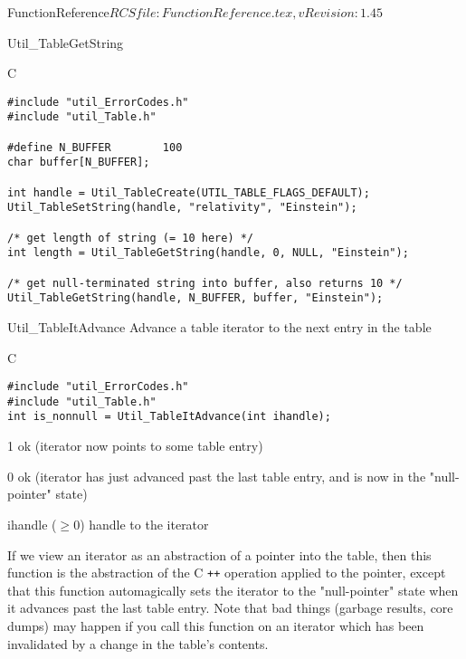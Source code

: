 \begin{cactuspart}{5}{FunctionReference}{$RCSfile: FunctionReference.tex,v $}{$Revision: 1.45 $}
\begin{FunctionDescription}{Util\_TableGetString}
\begin{Example}{C}
\begin{verbatim}
#include "util_ErrorCodes.h"
#include "util_Table.h"

#define N_BUFFER        100
char buffer[N_BUFFER];

int handle = Util_TableCreate(UTIL_TABLE_FLAGS_DEFAULT);
Util_TableSetString(handle, "relativity", "Einstein");

/* get length of string (= 10 here) */
int length = Util_TableGetString(handle, 0, NULL, "Einstein");

/* get null-terminated string into buffer, also returns 10 */
Util_TableGetString(handle, N_BUFFER, buffer, "Einstein");
\end{verbatim}
\end{Example}
\end{FunctionDescription}


\begin{FunctionDescription}{Util\_TableItAdvance}
\label{Util-TableItAdvance}
Advance a table iterator to the next entry in the table

\begin{Synopsis}{C}
\begin{verbatim}
#include "util_ErrorCodes.h"
#include "util_Table.h"
int is_nonnull = Util_TableItAdvance(int ihandle);
\end{verbatim}
\end{Synopsis}

\begin{Result}{\rm 1}
ok (iterator now points to some table entry)
\end{Result}
\begin{Result}{\rm 0}
ok (iterator has just advanced past the last table entry,
    and is now in the "null-pointer" state)
\end{Result}

\begin{Parameter}{ihandle ($\ge 0$)}
handle to the iterator
\end{Parameter}

\begin{Discussion}
If we view an iterator as an abstraction of a pointer into the table,
then this function is the abstraction of the C \verb|++| operation applied
to the pointer, except that this function automagically sets the iterator
to the "null-pointer" state when it advances past the last table entry.
\NewPar
Note that bad things (garbage results, core dumps) may happen if
you call this function on an iterator which has been invalidated
by a change in the table's contents.
\end{Discussion}


\end{FunctionDescription}
\end{cactuspart}

